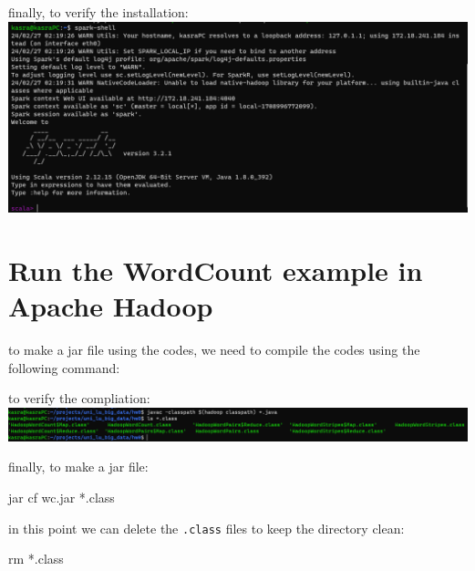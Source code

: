 \documentclass[
]{article}
\newenvironment{Shaded}{}{}
\newcommand{\ExtensionTok}[1]{#1}
\newcommand{\FunctionTok}[1]{\textcolor[rgb]{0.02,0.16,0.49}{#1}}
\newcommand{\NormalTok}[1]{#1}
\newcommand{\VariableTok}[1]{\textcolor[rgb]{0.10,0.09,0.49}{#1}}
\begin{document}
finally, to verify the installation:\\
\includegraphics{image-5.png}

\hypertarget{run-the-wordcount-example-in-apache-hadoop}{%
\section{Run the WordCount example in Apache
Hadoop}\label{run-the-wordcount-example-in-apache-hadoop}}

to make a jar file using the codes, we need to compile the codes using
the following command:

\begin{Shaded}
\end{Shaded}

to verify the compliation:\\
\includegraphics{image-6.png}

finally, to make a jar file:

\begin{Shaded}
\begin{Highlighting}[]
\ExtensionTok{jar}\NormalTok{ cf wc.jar *.class}
\end{Highlighting}
\end{Shaded}

in this point we can delete the \texttt{.class} files to keep the
directory clean:

\begin{Shaded}
\begin{Highlighting}[]
\FunctionTok{rm}\NormalTok{ *.class}
\end{Highlighting}
\end{Shaded}
\end{document}
